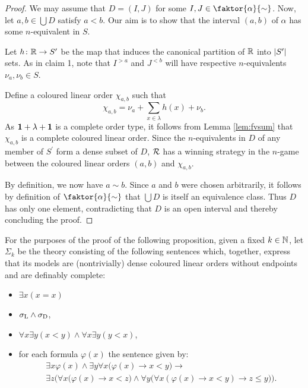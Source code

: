\begin{proof}
	We may assume that $D=(I,J)$ for some $I,J\in\faktor{\alpha}{\sim}$.  Now, let $a,b\in\bigcup D$ satisfy $a<b$.  Our aim is to show that the interval $(a,b)$ of $\alpha$ has some $n$-equivalent in $S$.

	Let $h\colon\mathbb{R}\to S^\prime$ be the map that induces the canonical partition of $\mathbb{R}$ into $\left\lvert S^\prime\right\rvert$ sets.  As in claim 1, note that $I^{>a}$ and $J^{<b}$ will have respective $n$-equivalents $\nu_a,\nu_b\in S$.

	Define a coloured linear order $\chi_{a,b}$ such that
	\begin{equation}
		\chi_{a,b}=\nu_a+\sum_{x\in\lambda}h(x)+\nu_b.
	\end{equation}
	As $\mathbf{1}+\lambda+\mathbf{1}$ is a complete order type, it follows from Lemma \ref{lem:fvsum} that $\chi_{a,b}$ is a complete coloured linear order.  Since the $n$-equivalents in $D$ of any member of $S^\prime$ form a dense subset of $D$, $\mathcal{R}$ has a winning strategy in the $n$-game between the coloured linear orders $(a,b)$ and $\chi_{a,b}$.

	By definition, we now have $a\sim b$.  Since $a$ and $b$ were chosen arbitrarily, it follows by definition of $\faktor{\alpha}{\sim}$ that $\bigcup D$ is itself an equivalence class.  Thus $D$ has only one element, contradicting that $D$ is an open interval and thereby concluding the proof.
\end{proof}

For the purposes of the proof of the following proposition, given a fixed $k\in\mathbb{N}$, let $\Sigma_k$ be the theory consisting of the following sentences which, together, express that its models are (nontrivially) dense coloured linear orders without endpoints and are definably complete:
\begin{itemize}
	\item	$\exists x(x=x)$
	\item	$\sigma_{\mathrm{L}}\wedge\sigma_{\mathrm{D}}$,
	\item	$\forall x\exists y(x<y)\wedge\forall x\exists y(y<x)$,
	\item	for each formula $\varphi(x)$ the sentence given by:
		\begin{multline}
			\exists x\varphi(x)\wedge\exists y\forall x\big(\varphi(x)\rightarrow x<y\big)\rightarrow\\
			\exists z\Big(\forall x\big(\varphi (x)\rightarrow x<z\big)\wedge\forall y\big(\forall x(\varphi(x)\rightarrow x<y)\rightarrow z\leq y\big)\Big).
		\end{multline}
\end{itemize}

